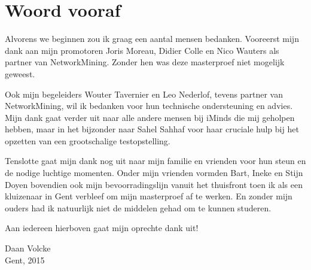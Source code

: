 \chapter*{Woord vooraf}

Alvorens we beginnen zou ik graag een aantal mensen bedanken.
Vooreerst mijn dank aan mijn promotoren Joris Moreau, Didier Colle en Nico Wauters als partner van NetworkMining.
Zonder hen was deze masterproef niet mogelijk geweest.

Ook mijn begeleiders Wouter Tavernier en Leo Nederlof, tevens partner van NetworkMining, wil ik bedanken voor hun technische ondersteuning en advies.
Mijn dank gaat verder uit naar alle andere mensen bij iMinds die mij geholpen hebben,
maar in het bijzonder naar Sahel Sahhaf voor haar cruciale hulp bij het opzetten van een grootschalige testopstelling.

Tenslotte gaat mijn dank nog uit naar mijn familie en vrienden voor hun steun en de nodige luchtige momenten.
Onder mijn vrienden vormden Bart, Ineke en Stijn Doyen bovendien ook mijn bevoorradingslijn vanuit het thuisfront toen ik als een kluizenaar in Gent verbleef om mijn masterproef af te werken.
En zonder mijn ouders had ik natuurlijk niet de middelen gehad om te kunnen studeren.


Aan iedereen hierboven gaat mijn oprechte dank uit!


\begin{flushright}
Daan Volcke \\
Gent, 2015
\end{flushright}

